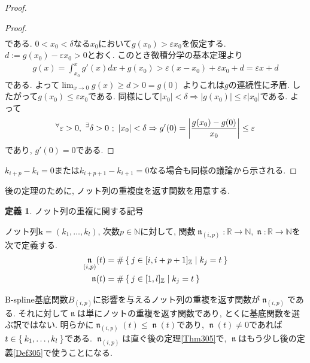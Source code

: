 \documentclass{jsarticle}
\newcommand\setN{\mathbb{N}}
\newcommand\setR{\mathbb{R}}
\newcommand\Abs[1]{\left|#1\right|}
\newcommand\squa[1]{[#1]}
\newcommand\E[1]{\!\,{\vphantom{#1}}^\exists #1}
\newcommand\A[1]{\!\,{\vphantom{#1}}^\forall #1}
\newcommand\Z[2]{\squa{#1,#2}_\mathbb{Z}}
\DeclareMathOperator{\N}{\mathfrak{n}}
\theoremstyle{definition}%
\newtheorem{defn}[thm]{定義}
\begin{document}
\begin{proof}
{\begin{proof}
\begin{align}
	    \end{align}
	    である.
	    $0<x_0<\delta$なる$x_0$において$g(x_0)>\varepsilon x_0$を仮定する.
	    $d:=g(x_0)-\varepsilon x_0>0$とおく.
	    このとき微積分学の基本定理より
	    \begin{align}
	        g(x)=\int_{x_0}^x g'(x) dx+g(x_0)>\varepsilon (x-x_0)+\varepsilon x_0 +d=\varepsilon x +d
	    \end{align}
	    である.
	    よって$\displaystyle \lim_{x\to 0}g(x)\geq d>0=g(0)$
	    よりこれは$g$の連続性に矛盾.
	    したがって$g(x_0)\leq\varepsilon x_0$である.
	    同様にして$|x_0|<\delta\Rightarrow |g(x_0)|\leq \varepsilon |x_0|$である.
	    よって
	    \begin{align}
			\A \varepsilon>0, \
			\E \delta>0\
			;\
			|x_0|<\delta
			\Rightarrow
	        g'(0)=\Abs{\frac{g(x_0)-g(0)}{x_0}}\leq\varepsilon
	    \end{align}
	    であり, $g'(0)=0$である.
	\end{proof}
	}
	$k_{i+p}-k_{i}=0$または$k_{i+p+1}-k_{i+1}=0$なる場合も同様の議論から示される.
\end{proof}

後の定理のために, ノット列の重複度を返す関数を用意する.

\begin{screen}
	\begin{defn}
	     ノット列の重複に関する記号

         ノット列$\bm{k}=(k_1,\dots,k_l)$, 次数$p\in \setN$に対して, 関数$\N_{(i,p)}:\setR\to \setN, \N:\setR\to \setN$を次で定義する.
         \begin{align}
             \N_{(i,p)}(t)
             &=\#\Set{j\in\Z{i}{i+p+1}|k_j=t} \\
             \N(t)
             &=\#\Set{j\in\Z{1}{l}|k_j=t}
         \end{align}
	\end{defn}
\end{screen}
B-spline基底関数$B_{(i,p)}$に影響を与えるノット列の重複を返す関数が$\N_{(i,p)}$である.
それに対して$\N$は単にノットの重複を返す関数であり, とくに基底関数を選ぶ訳ではない.
明らかに$\N_{(i,p)}(t)\le \N(t)$であり, $\N(t)\neq 0$であれば$t\in\Set{k_1,\dots, k_l}$である.
$\N_{(i,p)}$は直ぐ後の定理\ref{Thm305}で, $\N$はもう少し後の定義\ref{Def305}で使うことになる.
\end{document}
